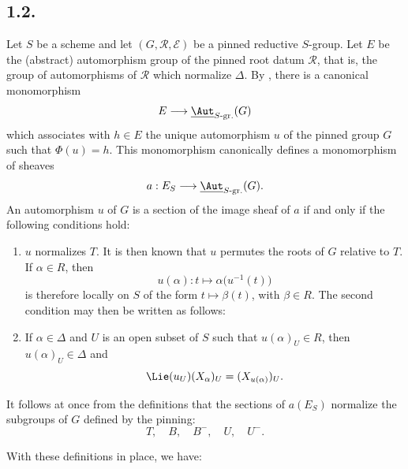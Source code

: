 \subsection*{1.2.}
Let \(S\) be a scheme and let \((G,\mathscr R,\mathcal E)\) be a
pinned reductive \(S\)-group. Let \(E\) be the \textup{(abstract)}
automorphism group of the pinned root datum \(\mathscr R\), that is,
the group of automorphisms of \(\mathscr R\) which normalize
\(\Delta\). By , there is a canonical monomorphism
\[
  E\longrightarrow \underline{\Aut}_{S\text{-}\mathrm{gr.}}(G)
\]
which associates with \(h\in E\) the unique automorphism \(u\) of the
pinned group \(G\) such that \(\Phi(u)=h\). This monomorphism
canonically defines a monomorphism of sheaves
\[
  a:E_S\longrightarrow \underline{\Aut}_{S\text{-}\mathrm{gr.}}(G).
\]
An automorphism \(u\) of \(G\) is a section of the image sheaf of \(a\)
if and only if the following conditions hold:
\begin{enumerate}
\item[(i)] \(u\) normalizes \(T\). It is then known that \(u\)
  permutes the roots of \(G\) relative to \(T\). If \(\alpha\in R\),
  then
  \[
    u(\alpha):t\longmapsto\alpha\bigl(u^{-1}(t)\bigr)
  \]
  is therefore locally on \(S\) of the form
  \(t\longmapsto\beta(t)\), with \(\beta\in R\). The second condition
  may then be written as follows:
\item[(ii)] If \(\alpha\in\Delta\) and \(U\) is an open subset of
  \(S\) such that \(u(\alpha)_U\in R\), then
  \(u(\alpha)_U\in\Delta\) and
  \[
    \Lie(u_U)(X_\alpha)_U=(X_{u(\alpha)})_U.
  \]
\end{enumerate}
It follows at once from the definitions that the sections of
\(a(E_S)\) normalize the subgroups of \(G\) defined by the pinning:
\[
  T,\quad B,\quad B^{-},\quad U,\quad U^{-}.
\]

With these definitions in place, we have:
